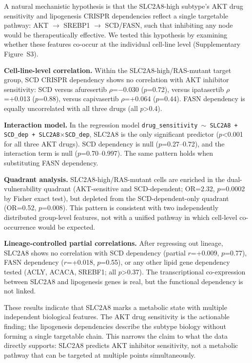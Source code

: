 \documentclass[12pt]{article}
\begin{document}
A natural mechanistic hypothesis is that the SLC2A8-high subtype's AKT
drug sensitivity and lipogenesis CRISPR dependencies reflect a single
targetable pathway: AKT $\rightarrow$ SREBP1 $\rightarrow$ SCD/FASN,
such that inhibiting any node would be therapeutically effective. We
tested this hypothesis by examining whether these features co-occur at
the individual cell-line level (Supplementary Figure~S3).

\textbf{Cell-line-level correlation.} Within the SLC2A8-high/RAS-mutant
target group, SCD CRISPR dependency shows no correlation with AKT
inhibitor sensitivity: SCD versus afuresertib $\rho$=$-$0.030
($p$=0.72), versus ipatasertib $\rho$=+0.013 ($p$=0.88), versus
capivasertib $\rho$=+0.064 ($p$=0.44). FASN dependency is equally
uncorrelated with all three drugs (all $p$>0.4).

\textbf{Interaction model.} In the regression model
\texttt{drug\_sensitivity $\sim$ SLC2A8 + SCD\_dep + SLC2A8$\times$SCD\_dep},
SLC2A8 is the only significant predictor ($p$<0.001 for all three AKT
drugs). SCD dependency is null ($p$=0.27--0.72), and the interaction
term is null ($p$=0.70--0.997). The same pattern holds when substituting
FASN dependency.

\textbf{Quadrant analysis.} SLC2A8-high/RAS-mutant cells are enriched in
the dual-vulnerability quadrant (AKT-sensitive and SCD-dependent;
OR=2.32, $p$=0.0002 by Fisher exact test), but depleted from the
SCD-dependent-only quadrant (OR=0.52, $p$=0.008). This pattern is
consistent with two independently distributed group-level features, not
with a unified pathway in which cell-level co-occurrence would be
expected.

\textbf{Lineage-controlled partial correlations.} After regressing out
lineage, SLC2A8 shows no correlation with SCD dependency (partial
$r$=+0.009, $p$=0.77), FASN dependency ($r$=+0.018, $p$=0.55), or any
other lipid gene dependency tested (ACLY, ACACA, SREBF1; all $p$>0.37).
The transcriptional co-expression between SLC2A8 and lipogenesis genes
is real, but the functional dependency is not linked.

These results indicate that SLC2A8 marks a metabolic state with multiple
independent biological features. The AKT drug sensitivity is the
actionable finding; the lipogenesis dependencies describe the subtype
biology without forming a single targetable chain. This narrows the
claim to what the data directly supports: SLC2A8 predicts AKT inhibitor
sensitivity, not a metabolic pathway that can be targeted at multiple
points simultaneously.
\end{document}
